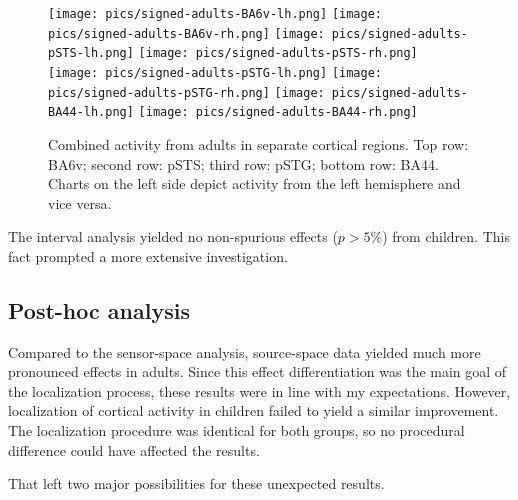 \begin{figure}[H]
\begin{center}
\texttt{[image: pics/signed-adults-BA6v-lh.png]}
\texttt{[image: pics/signed-adults-BA6v-rh.png]}
\texttt{[image: pics/signed-adults-pSTS-lh.png]}
\texttt{[image: pics/signed-adults-pSTS-rh.png]}
\texttt{[image: pics/signed-adults-pSTG-lh.png]}
\texttt{[image: pics/signed-adults-pSTG-rh.png]}
\texttt{[image: pics/signed-adults-BA44-lh.png]}
\texttt{[image: pics/signed-adults-BA44-rh.png]}
\caption{\label{4.3.activity.adults.ventral} Combined activity from adults in separate cortical regions. Top row: BA6v; second row: pSTS; third row: pSTG; bottom row: BA44. Charts on the left side depict activity from the left hemisphere and vice versa.}
\end{center}
\end{figure}

\clearpage

The interval analysis yielded no non-spurious effects ($p > 5\%$) from children.
This fact prompted a more extensive investigation.

\subsection{Post-hoc analysis}

Compared to the sensor-space analysis, source-space data yielded much more pronounced effects in adults.
Since this effect differentiation was the main goal of the localization process, these results were in line with my expectations.
However, localization of cortical activity in children failed to yield a similar improvement.
The localization procedure was identical for both groups, so no procedural difference could have affected the results.

That left two major possibilities for these unexpected results.

